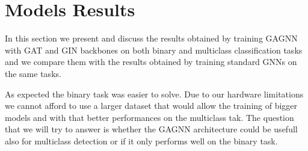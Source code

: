 \section{Models Results}\label{res}

In this section we present and discuss the results obtained by training GAGNN with GAT and GIN backbones on both binary and multiclass classification tasks and we compare them with the results obtained by training standard GNNs on the same tasks.

As expected the binary task was easier to solve. Due to our hardware limitations we cannot afford to use a larger dataset that would allow the training of bigger models and with that better performances on the multiclass tak. The question that we will try to answer is whether the GAGNN architecture could be usefull also for multiclass detection or if it only performs well on the binary task. 

